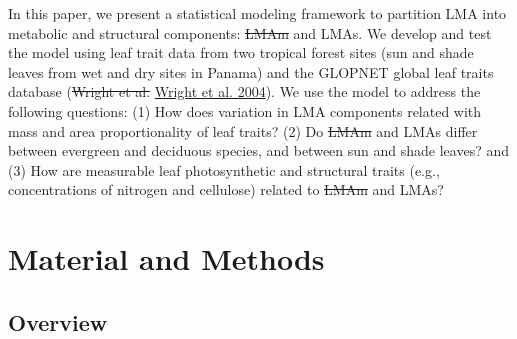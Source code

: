 \documentclass[
  12pt,
]{article}
\providecommand{\DIFaddtex}[1]{{\protect\color{blue}\uwave{#1}}} %
\providecommand{\DIFdeltex}[1]{{\protect\color{red}\sout{#1}}}                      %
\providecommand{\DIFaddbegin}{} %
\providecommand{\DIFaddend}{} %
\providecommand{\DIFdelbegin}{} %
\providecommand{\DIFdelend}{} %
\providecommand{\DIFadd}[1]{\texorpdfstring{\DIFaddtex{#1}}{#1}} %
\providecommand{\DIFdel}[1]{\texorpdfstring{\DIFdeltex{#1}}{}} %
\newcommand{\DIFscaledelfig}{0.5}
\newlength{\DIFdelgraphicswidth} %
\newlength{\DIFdelgraphicsheight} %
\newcommand{\DIFaddincludegraphics}[2][]{{\color{blue}\fbox{\DIFOincludegraphics[#1]{#2}}}} %
\newcommand{\DIFdelincludegraphics}[2][]{%
\sbox{\DIFdelgraphicsbox}{\DIFOincludegraphics[#1]{#2}}%
\settoboxwidth{\DIFdelgraphicswidth}{\DIFdelgraphicsbox} %
\settoboxtotalheight{\DIFdelgraphicsheight}{\DIFdelgraphicsbox} %
\scalebox{\DIFscaledelfig}{%
\parbox[b]{\DIFdelgraphicswidth}{\usebox{\DIFdelgraphicsbox}\\[-\baselineskip] \rule{\DIFdelgraphicswidth}{0em}}\llap{\resizebox{\DIFdelgraphicswidth}{\DIFdelgraphicsheight}{%
\setlength{\unitlength}{\DIFdelgraphicswidth}%
\begin{picture}(1,1)%
\thicklines\linethickness{2pt} %
{\color[rgb]{1,0,0}\put(0,0){\framebox(1,1){}}}%
{\color[rgb]{1,0,0}\put(0,0){\line( 1,1){1}}}%
{\color[rgb]{1,0,0}\put(0,1){\line(1,-1){1}}}%
\end{picture}%
}\hspace*{3pt}}} %
} %
\DeclareRobustCommand{\DIFaddbegin}{\DIFOaddbegin \let\includegraphics\DIFaddincludegraphics} %
\DeclareRobustCommand{\DIFaddend}{\DIFOaddend \let\includegraphics\DIFOincludegraphics} %
\DeclareRobustCommand{\DIFdelbegin}{\DIFOdelbegin \let\includegraphics\DIFdelincludegraphics} %
\DeclareRobustCommand{\DIFdelend}{\DIFOaddend \let\includegraphics\DIFOincludegraphics} %
\begin{document}
In this paper, we present a statistical modeling framework to partition LMA into metabolic and structural components: \DIFdelbegin \DIFdel{LMAm }\DIFdelend \DIFaddbegin \DIFadd{LMAp }\DIFaddend and LMAs.
We develop and test the model using leaf trait data from two tropical forest sites (sun and shade leaves from wet and dry sites in Panama) and the GLOPNET global leaf traits database (\DIFdelbegin \DIFdel{Wright et al. }\DIFdelend \protect\DIFdelbegin %
\DIFdelend \DIFaddbegin \hyperlink{ref-Wright2004a}{Wright et al. 2004}\DIFaddend ).
We use the model to address the following questions: (1) How does variation in LMA components related with mass and area proportionality of leaf traits? (2) Do \DIFdelbegin \DIFdel{LMAm }\DIFdelend \DIFaddbegin \DIFadd{LMAp }\DIFaddend and LMAs differ between evergreen and deciduous species, and between sun and shade leaves? and (3) How are measurable leaf photosynthetic and structural traits (e.g., concentrations of nitrogen and cellulose) related to \DIFdelbegin \DIFdel{LMAm }\DIFdelend \DIFaddbegin \DIFadd{LMAp }\DIFaddend and LMAs?

\hypertarget{material-and-methods}{%
\section{Material and Methods}\label{material-and-methods}}

\DIFdelbegin %
\DIFdelend \DIFaddbegin \hypertarget{overview}{%
\subsection{Overview}\label{overview}}
\DIFaddend 
\end{document}
